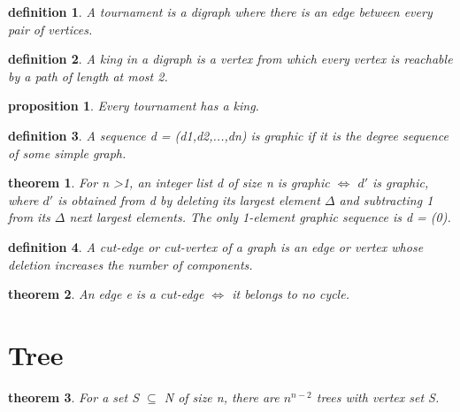 \documentclass[twocolumn][2pt]{article}
\newtheorem{theorem}{theorem}[section]  %
\newtheorem{definition}{definition}
\newtheorem{proposition}{proposition}
\begin{document}
\begin{CJK*}{UTF8}{bkai}
    \begin{definition}
        A tournament is a digraph where there is an edge between every pair of
 vertices.
    \end{definition}

    \begin{definition}
         A king in a digraph is a vertex from which every vertex is reachable by a path
 of length at most 2.
    \end{definition}

    \begin{proposition}
        Every tournament has a king.
    \end{proposition}

    \begin{definition}
         A sequence d = (d1,d2,...,dn) is graphic if it is the degree sequence of some
 simple graph.
    \end{definition}

    \begin{theorem}
         For n >1, an integer list d of size n is graphic $\iff$ $d\prime$ is graphic, where $d\prime$ is
 obtained from d by deleting its largest element $\Delta$ and subtracting 1 from its $\Delta$
 next largest elements. The only 1-element graphic sequence is d = (0).
    \end{theorem}

    \begin{definition}
         A cut-edge or cut-vertex of a graph is an edge or vertex whose deletion
 increases the number of components.
    \end{definition}

    \begin{theorem}
        An edge e is a cut-edge $\iff$ it belongs to no cycle.
    \end{theorem}

    
    


\section*{Tree}

    \begin{theorem}
         For a set S $\subseteq$ N of size n, there are $n^{n-2}$ trees with vertex set S.
    \end{theorem}


\end{CJK*}
\end{document}
